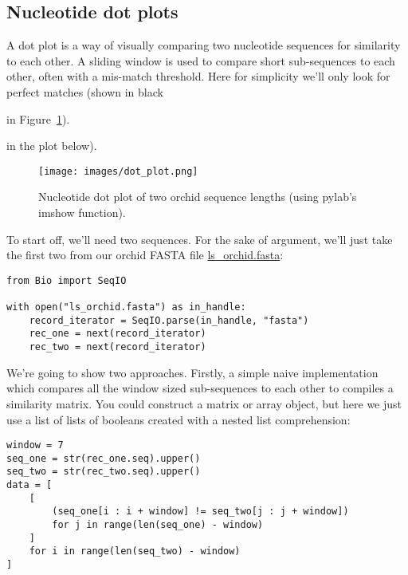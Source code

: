 \subsection{Nucleotide dot plots}
A dot plot is a way of visually comparing two nucleotide sequences for similarity to
each other.  A sliding window is used to compare short sub-sequences to each other,
often with a mis-match threshold.  Here for simplicity we'll only look for perfect
matches (shown in black
\begin{latexonly}
in Figure~\ref{fig:nuc-dot-plot}).
\end{latexonly}
\begin{htmlonly}
in the plot below).
\end{htmlonly}

%
%
\begin{latexonly}
\begin{figure}[htbp]
\centering
\texttt{[image: images/dot\_plot.png]}
\caption{Nucleotide dot plot of two orchid sequence lengths (using pylab's imshow function).}
\label{fig:nuc-dot-plot}
\end{figure}
\end{latexonly}

To start off, we'll need two sequences.  For the sake of argument, we'll just take
the first two from our orchid FASTA file \href{https://raw.githubusercontent.com/biopython/biopython/master/Doc/examples/ls_orchid.fasta}{ls\_orchid.fasta}:

\begin{verbatim}
from Bio import SeqIO

with open("ls_orchid.fasta") as in_handle:
    record_iterator = SeqIO.parse(in_handle, "fasta")
    rec_one = next(record_iterator)
    rec_two = next(record_iterator)
\end{verbatim}

We're going to show two approaches.  Firstly, a simple naive implementation
which compares all the window sized sub-sequences to each other to compiles a
similarity matrix.  You could construct a matrix or array object, but here we
just use a list of lists of booleans created with a nested list
comprehension:

\begin{verbatim}
window = 7
seq_one = str(rec_one.seq).upper()
seq_two = str(rec_two.seq).upper()
data = [
    [
        (seq_one[i : i + window] != seq_two[j : j + window])
        for j in range(len(seq_one) - window)
    ]
    for i in range(len(seq_two) - window)
]
\end{verbatim}

